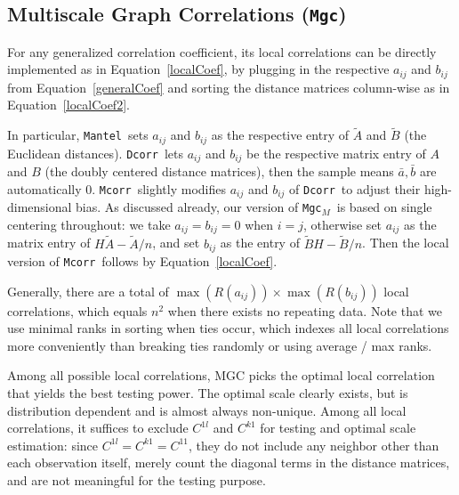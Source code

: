 \documentclass[11pt]{article}
\providecommand{\sct}[1]{{\sc \texttt{#1}}}
\newcommand{\G}{C}
\newcommand{\Mgc}{\sct{Mgc}}
\newcommand{\Mgcm}{\sct{Mgc$_M$}}
\newcommand{\Dcorr}{\sct{Dcorr}}
\newcommand{\Mcorr}{\sct{Mcorr}}
\newcommand{\Mantel}{\sct{Mantel}}
\begin{document}
\subsection{Multiscale Graph Correlations (\Mgc)}
\label{appen:mgc}
For any generalized correlation coefficient, its local correlations can be directly implemented as in Equation~\ref{localCoef}, by plugging in the respective $a_{ij}$ and $b_{ij}$ from Equation~\ref{generalCoef} and sorting the distance matrices column-wise as in Equation~\ref{localCoef2}.

In particular, \Mantel~sets $a_{ij}$ and $b_{ij}$ as the respective entry of $\tilde{A}$ and $\tilde{B}$ (the Euclidean distances). \Dcorr~lets $a_{ij}$ and $b_{ij}$ be the respective matrix entry of $A$ and $B$ (the doubly centered distance matrices), then the sample means $\bar{a}, \bar{b}$ are automatically $0$. \Mcorr~slightly modifies $a_{ij}$ and $b_{ij}$ of \Dcorr~to adjust their high-dimensional bias. As discussed already, our version of \Mgcm~is based on single centering throughout: we take $a_{ij}=b_{ij}=0$ when $i=j$, otherwise set $a_{ij}$ as the matrix entry of $H\tilde{A}-\tilde{A}/n$, and set $b_{ij}$ as the entry of $\tilde{B}H-\tilde{B}/n$. Then the local version of \Mcorr~follows by Equation~\ref{localCoef}.

Generally, there are a total of $\max(R(a_{ij})) \times \max(R(b_{ij}))$ local correlations, which equals $n^2$ when there exists no repeating data. Note that we use minimal ranks in sorting when ties occur, which indexes all local correlations more conveniently than breaking ties randomly or using average / max ranks.

Among all possible local correlations, MGC picks the optimal local correlation that yields the best testing power. The optimal scale clearly exists, but is distribution dependent and is almost always non-unique. Among all local correlations, it suffices to exclude $\G^{1l}$ and $\G^{k1}$ for testing and optimal scale estimation: since $\G^{1l}=\G^{k1}=\G^{11}$, they do not include any neighbor other than each observation itself, merely count the diagonal terms in the distance matrices, and are not meaningful for the testing purpose.

\end{document}
